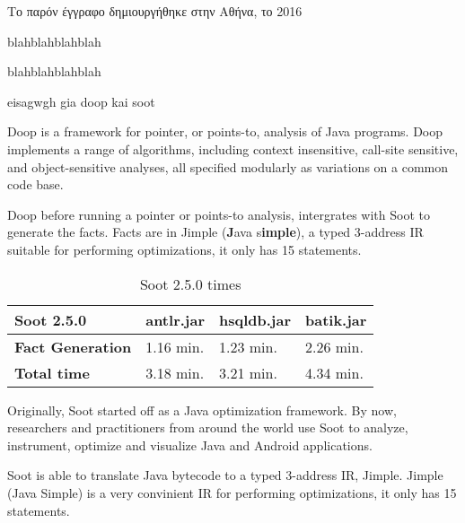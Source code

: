 \documentclass{dithesis}
\begin{document}
\begin{thesisprologue}[PROLOGUE]
    Το παρόν έγγραφο δημιουργήθηκε στην Αθήνα, το 2016 
    
    blahblahblahblah

    blahblahblahblah
\end{thesisprologue}

    eisagwgh gia doop kai soot

    Doop is a framework for pointer, or points-to, analysis of Java programs. 
    Doop implements a range of algorithms, including context insensitive, call-site sensitive, 
    and object-sensitive analyses, all specified modularly as variations on a common code base.
    \cite{Doop: Framework for Java Pointer Analysis}

        Doop before running a pointer or points-to analysis, intergrates with Soot to generate
        the facts. Facts are in Jimple (\textbf{J}ava s\textbf{imple}), a typed 3-address IR suitable for performing optimizations, it only has 15 statements.

        \begin{table}[H]
            \centering
            \label{my-label}
            \begin{tabular}{llll}
                \hline
                \textbf{Soot 2.5.0}      & \textbf{antlr.jar} & \textbf{hsqldb.jar} & \textbf{batik.jar} \\ \hline
                \textbf{Fact Generation} & 1.16 min.          & 1.23 min.           & 2.26 min.          \\
                \textbf{Total time}      & 3.18 min.          & 3.21 min.           & 4.34 min.          \\ \hline
            \end{tabular}
            \caption{Soot 2.5.0 times}
        \end{table}



    Originally, Soot started off as a Java optimization framework. By now, researchers and 
    practitioners from around the world use Soot to analyze, instrument, optimize and 
    visualize Java and Android applications.
    \cite{Sable: Soot}
    
        Soot is able to translate Java bytecode to a typed 3-address IR, Jimple. Jimple (Java Simple) is a very convinient IR for performing optimizations, it only has 15 statements.
\end{document}
